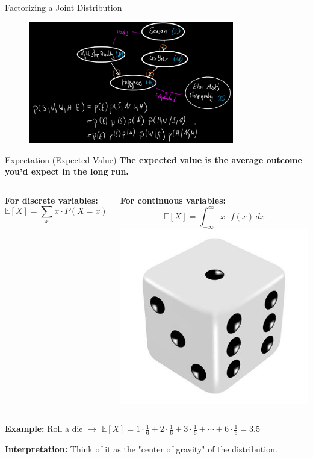 \documentclass[handout,aspectratio=169]{beamer}
\begin{document}
\begin{frame}{Factorizing a Joint Distribution}
    \begin{figure}[htbp]
		\centering
		\includegraphics[width=0.8\textwidth]{figs/factorization.png}
	\end{figure}
\end{frame}

\begin{frame}{Expectation (Expected Value)}
  \textbf{The expected value is the average outcome you'd expect in the long run.}
\vspace{1em}
    \begin{columns}
    
  \textbf{For discrete variables:}
  \[
    \mathbb{E}[X] = \sum_x x \cdot P(X = x)
  \]

  \textbf{For continuous variables:}
  \[
    \mathbb{E}[X] = \int_{-\infty}^{\infty} x \cdot f(x) \, dx
  \]
    \includegraphics[width=0.5\linewidth]{figs/dice.png}
\end{columns}

  

  \vspace{1em}
  \textbf{Example:} Roll a die $\rightarrow$ $\mathbb{E}[X] = 1\cdot \frac{1}{6} + 2\cdot \frac{1}{6} + 3\cdot \frac{1}{6} + \cdots + 6 \cdot \frac{1}{6} = 3.5$

  \vspace{1em}
  \textbf{Interpretation:} Think of it as the "center of gravity" of the distribution.
\end{frame}
\end{document}
